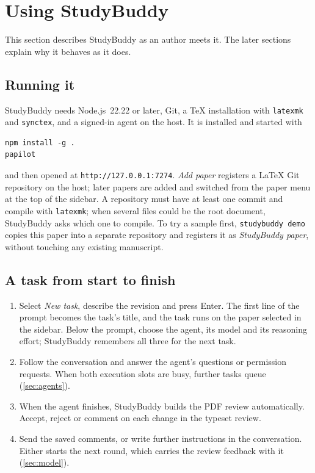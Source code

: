 \section{Using StudyBuddy}
\label{sec:using}

This section describes StudyBuddy as an author meets it. The later sections
explain why it behaves as it does.

\subsection{Running it}

StudyBuddy needs Node.js~22.22 or later, Git, a \TeX{} installation with
\texttt{latexmk} and \texttt{synctex}, and a signed-in agent on the host. It is
installed and started with
\begin{verbatim}
npm install -g .
papilot
\end{verbatim}
and then opened at \texttt{http://127.0.0.1:7274}. \emph{Add paper} registers a
\LaTeX{} Git repository on the host; later papers are added and switched from
the paper menu at the top of the sidebar. A repository must have at least one
commit and compile with \texttt{latexmk}; when several files could be the root
document, StudyBuddy asks which one to compile. To try a sample first, \texttt{studybuddy demo}
copies this paper into a separate repository and registers it as
\emph{StudyBuddy paper}, without touching any existing manuscript.

\subsection{A task from start to finish}

\begin{enumerate}
  \item Select \emph{New task}, describe the revision and press Enter. The first
    line of the prompt becomes the task's title, and the task runs on the paper
    selected in the sidebar. Below the prompt, choose the agent, its model and
    its reasoning effort; StudyBuddy remembers all three for the next task.
  \item Follow the conversation and answer the agent's questions or permission
    requests. When both execution slots are busy, further tasks queue
    (\cref{sec:agents}).
  \item When the agent finishes, StudyBuddy builds the PDF review automatically.
    Accept, reject or comment on each change in the typeset review.
  \item Send the saved comments, or write further instructions in the
    conversation. Either starts the next round, which carries the review
    feedback with it (\cref{sec:model}).
\end{enumerate}

